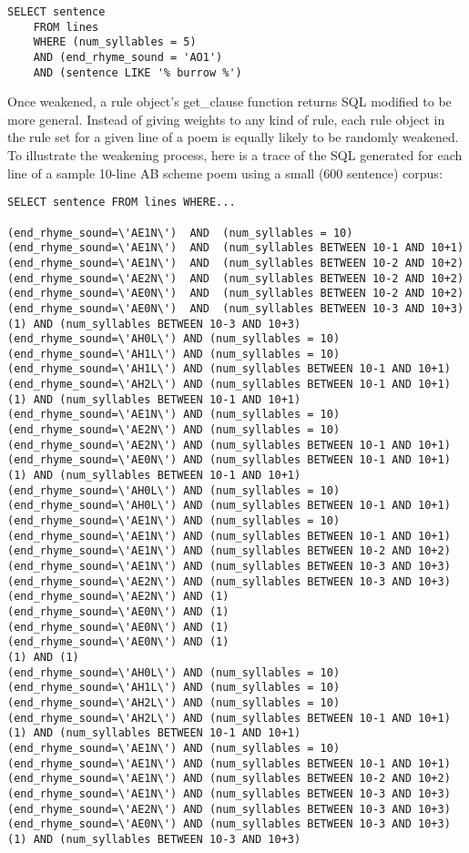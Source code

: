 \documentclass[10pt]{article}
\begin{document}
\begin{verbatim}
SELECT sentence 
    FROM lines 
    WHERE (num_syllables = 5) 
    AND (end_rhyme_sound = 'AO1') 
    AND (sentence LIKE '% burrow %')
\end{verbatim}

Once weakened, a rule object's get\_clause function returns SQL modified to be
more general. Instead of giving weights to any kind of rule, each rule object
in the rule set for a given line of a poem is equally likely to be randomly
weakened. To illustrate the weakening process, here is a trace of the SQL
generated for each line of a sample 10-line AB scheme poem using a small (600
sentence) corpus:

\begin{verbatim}
SELECT sentence FROM lines WHERE...

(end_rhyme_sound=\'AE1N\')  AND  (num_syllables = 10)
(end_rhyme_sound=\'AE1N\')  AND  (num_syllables BETWEEN 10-1 AND 10+1)
(end_rhyme_sound=\'AE1N\')  AND  (num_syllables BETWEEN 10-2 AND 10+2)
(end_rhyme_sound=\'AE2N\')  AND  (num_syllables BETWEEN 10-2 AND 10+2)
(end_rhyme_sound=\'AE0N\')  AND  (num_syllables BETWEEN 10-2 AND 10+2)
(end_rhyme_sound=\'AE0N\')  AND  (num_syllables BETWEEN 10-3 AND 10+3)
(1) AND (num_syllables BETWEEN 10-3 AND 10+3)
(end_rhyme_sound=\'AH0L\') AND (num_syllables = 10)
(end_rhyme_sound=\'AH1L\') AND (num_syllables = 10)
(end_rhyme_sound=\'AH1L\') AND (num_syllables BETWEEN 10-1 AND 10+1)
(end_rhyme_sound=\'AH2L\') AND (num_syllables BETWEEN 10-1 AND 10+1)
(1) AND (num_syllables BETWEEN 10-1 AND 10+1)
(end_rhyme_sound=\'AE1N\') AND (num_syllables = 10)
(end_rhyme_sound=\'AE2N\') AND (num_syllables = 10)
(end_rhyme_sound=\'AE2N\') AND (num_syllables BETWEEN 10-1 AND 10+1)
(end_rhyme_sound=\'AE0N\') AND (num_syllables BETWEEN 10-1 AND 10+1)
(1) AND (num_syllables BETWEEN 10-1 AND 10+1)
(end_rhyme_sound=\'AH0L\') AND (num_syllables = 10)
(end_rhyme_sound=\'AH0L\') AND (num_syllables BETWEEN 10-1 AND 10+1)
(end_rhyme_sound=\'AE1N\') AND (num_syllables = 10)
(end_rhyme_sound=\'AE1N\') AND (num_syllables BETWEEN 10-1 AND 10+1)
(end_rhyme_sound=\'AE1N\') AND (num_syllables BETWEEN 10-2 AND 10+2)
(end_rhyme_sound=\'AE1N\') AND (num_syllables BETWEEN 10-3 AND 10+3)
(end_rhyme_sound=\'AE2N\') AND (num_syllables BETWEEN 10-3 AND 10+3)
(end_rhyme_sound=\'AE2N\') AND (1)
(end_rhyme_sound=\'AE0N\') AND (1)
(end_rhyme_sound=\'AE0N\') AND (1)
(end_rhyme_sound=\'AE0N\') AND (1)
(1) AND (1)
(end_rhyme_sound=\'AH0L\') AND (num_syllables = 10)
(end_rhyme_sound=\'AH1L\') AND (num_syllables = 10)
(end_rhyme_sound=\'AH2L\') AND (num_syllables = 10)
(end_rhyme_sound=\'AH2L\') AND (num_syllables BETWEEN 10-1 AND 10+1)
(1) AND (num_syllables BETWEEN 10-1 AND 10+1)
(end_rhyme_sound=\'AE1N\') AND (num_syllables = 10)
(end_rhyme_sound=\'AE1N\') AND (num_syllables BETWEEN 10-1 AND 10+1)
(end_rhyme_sound=\'AE1N\') AND (num_syllables BETWEEN 10-2 AND 10+2)
(end_rhyme_sound=\'AE1N\') AND (num_syllables BETWEEN 10-3 AND 10+3)
(end_rhyme_sound=\'AE2N\') AND (num_syllables BETWEEN 10-3 AND 10+3)
(end_rhyme_sound=\'AE0N\') AND (num_syllables BETWEEN 10-3 AND 10+3)
(1) AND (num_syllables BETWEEN 10-3 AND 10+3)


\end{verbatim}
\end{document}
